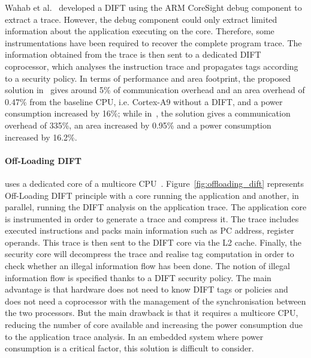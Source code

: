 Wahab et al.~\cite{WCAHLG-17-fpl, WCAHBLG-18-reconfig} developed a DIFT using the ARM CoreSight debug component to extract a trace.
However, the debug component could only extract limited information about the application executing on the core. Therefore, some instrumentations have been required to recover the complete program trace. The information obtained from the trace is then sent to a dedicated DIFT coprocessor, which analyses the instruction trace and propagates tags according to a security policy. In terms of performance and area footprint, the proposed solution in~\cite{WCAHLG-17-fpl} gives around 5\% of communication overhead and an area overhead of 0.47\% from the baseline CPU, i.e. Cortex-A9 without a DIFT, and a power consumption increased by 16\%; while in~\cite{WCAHBLG-18-reconfig}, the solution gives a communication overhead of 335\%, an area increased by 0.95\% and a power consumption increased by 16.2\%.

\paragraph{Off-Loading DIFT} uses a dedicated core of a multicore CPU~\cite{CKSFGMRRRV-08-sigarch,VHYR-08-cca,RGMRCKR-08-spaa}. Figure~\ref{fig:offloading_dift} represents Off-Loading DIFT principle with a core running the application and another, in parallel, running the DIFT analysis on the application trace. The application core is instrumented in order to generate a trace and compress it. The trace includes executed instructions and packs main information such as PC address, register operands. This trace is then sent to the DIFT core via the L2 cache. Finally, the security core will decompress the trace and realise tag computation in order to check whether an illegal information flow has been done. The notion of illegal information flow is specified thanks to a DIFT security policy.
The main advantage is that hardware does not need to know DIFT tags or policies and does not need a coprocessor with the management of the synchronisation between the two processors.  But the main drawback is that it requires a multicore CPU, reducing the number of core available and increasing the power consumption due to the application trace analysis. In an embedded system where power consumption is a critical factor, this solution is difficult to consider.

